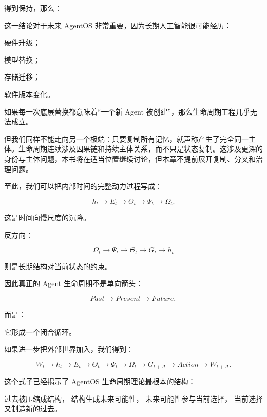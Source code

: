 得到保持，那么：

\begin{statementbox}
\centering
{}
\end{statementbox}

这一结论对于未来 AgentOS 非常重要，因为长期人工智能很可能经历：

硬件升级；

模型替换；

存储迁移；

软件版本变化。

如果每一次底层替换都意味着“一个新 Agent 被创建”，那么生命周期工程几乎无法成立。

但我们同样不能走向另一个极端：只要复制所有记忆，就声称产生了完全同一主体。生命周期连续涉及因果链和持续主体关系，而不只是状态复制。这涉及更深的身份与主体问题，本书将在适当位置继续讨论，但本章不提前展开复制、分叉和治理问题。

至此，我们可以把内部时间的完整动力过程写成：

\[
h_t
\rightarrow
E_t
\rightarrow
\Theta_t
\rightarrow
\Psi_t
\rightarrow
\Omega_t.
\]

这是时间向慢尺度的沉降。

反方向：

\[
\Omega_t
\rightarrow
\Psi_t
\rightarrow
\Theta_t
\rightarrow
G_t
\rightarrow
h_t
\]

则是长期结构对当前状态的约束。

因此真正的 Agent 生命周期不是单向箭头：

\[
Past
\rightarrow
Present
\rightarrow
Future,
\]

而是：

\begin{statementbox}
\centering
{}
\end{statementbox}

它形成一个闭合循环。

如果进一步把外部世界加入，我们得到：

\[
W_t
\rightarrow
h_t
\rightarrow
E_t
\rightarrow
\Theta_t
\rightarrow
\Psi_t
\rightarrow
\Omega_t
\rightarrow
G_{t+\Delta}
\rightarrow
Action
\rightarrow
W_{t+\Delta}.
\]

这个式子已经揭示了 AgentOS 生命周期理论最根本的结构：

\begin{statementbox}
过去被压缩成结构，
结构生成未来可能性，
未来可能性参与当前选择，
当前选择又制造新的过去。
\end{statementbox}


